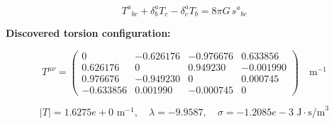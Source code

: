 
\begin{equation}
  T^a{}_{bc} + \delta^a_b T_c - \delta^a_c T_b = 8\pi G \, s^a{}_{bc}
\end{equation}

\textbf{Discovered torsion configuration:}

\begin{equation}
  T^{\mu\nu} = \begin{pmatrix}
    0 & -0.626176 & -0.976676 & 0.633856 \\
    0.626176 & 0 & 0.949230 & -0.001990 \\
    0.976676 & -0.949230 & 0 & 0.000745 \\
    -0.633856 & 0.001990 & -0.000745 & 0
  \end{pmatrix} \quad \text{m}^{-1}
\end{equation}

\begin{equation}
  |T| = 1.6275e+0 \text{ m}^{-1}, \quad
  \lambda = -9.9587, \quad
  \sigma = -1.2085e-3 \text{ J}\cdot\text{s/m}^3
\end{equation}